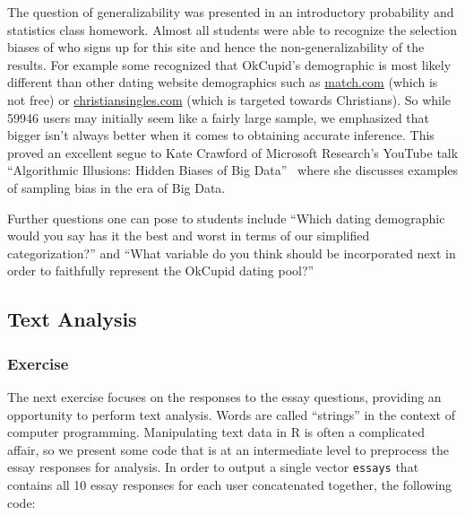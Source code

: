 \documentclass{article}\usepackage[]{graphicx}\usepackage[]{color}
\begin{document}
The question of generalizability was presented in an introductory probability and statistics class homework.  Almost all students were able to recognize the selection biases of who signs up for this site and hence the non-generalizability of the results.  For example some recognized that OkCupid's demographic is most likely different than other dating website demographics such as \url{match.com} (which is not free) or \url{christiansingles.com} (which is targeted towards Christians).  So while 59946 users may initially seem like a fairly large sample, we emphasized that bigger isn't always better when it comes to obtaining accurate inference.  This proved an excellent segue to Kate Crawford of Microsoft Research's YouTube talk ``Algorithmic Illusions: Hidden Biases of Big Data''~\cite{Strata} where she discusses examples of sampling bias in the era of Big Data.

Further questions one can pose to students include ``Which dating demographic would you say has it the best and worst in terms of our simplified categorization?'' and ``What variable do you think should be incorporated next in order to faithfully represent the OkCupid dating pool?''






\subsection{Text Analysis}\label{essays}
\subsubsection{Exercise}
The next exercise focuses on the responses to the essay questions, providing an opportunity to perform text analysis.  Words are called ``strings'' in the context of computer programming.  Manipulating text data in R is often a complicated affair, so we present some code that is at an intermediate level to preprocess the essay responses for analysis.  In order to output a single vector \verb#essays# that contains all 10 essay responses for each user concatenated together, the following code:
\end{document}
